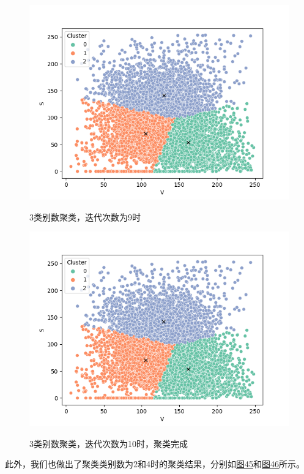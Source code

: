 \documentclass[UTF8]{ctexart}
\begin{document}
	\begin{figure}[htbp]
	\centering
	\caption{3类别数聚类，迭代次数为9时}
	\includegraphics[width=1.0\textwidth]{cluster9.png}
	\label{Fig.43}
	\end{figure}

	\begin{figure}[htbp]
	\centering
	\caption{3类别数聚类，迭代次数为10时，聚类完成}
	\includegraphics[width=1.0\textwidth]{cluster_final.png}
	\label{Fig.44}
	\end{figure}
	
	此外，我们也做出了聚类类别数为2和4时的聚类结果，分别如\hyperref[Fig.45]{图45}和\hyperref[Fig.46]{图46}所示。
	
\end{document}
